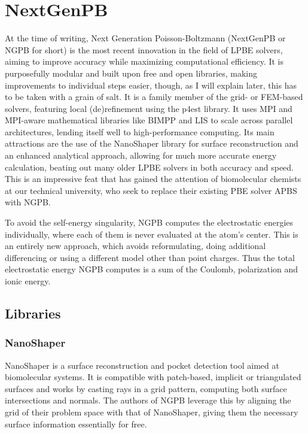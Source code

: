 \chapter{NextGenPB}
\label{sec:nextgenpb}

At the time of writing, Next Generation Poisson-Boltzmann (NextGenPB or NGPB for short) \cite{diflorio2025nextgenpb} is the most recent innovation in the field of LPBE solvers, aiming to improve accuracy while maximizing computational efficiency. 
It is purposefully modular and built upon free and open libraries, making improvements to individual steps easier, though, as I will explain later, this has to be taken with a grain of salt.
It is a family member of the grid- or FEM-based solvers, featuring local (de)refinement using the p4est library.
It uses MPI and MPI-aware mathematical libraries like BIMPP and LIS to scale across parallel architectures, lending itself well to high-performance computing.
Its main attractions are the use of the NanoShaper library for surface reconstruction and an enhanced analytical approach, allowing for much more accurate energy calculation, beating out many older LPBE solvers in both accuracy and speed.
This is an impressive feat that has gained the attention of biomolecular chemists at our technical university, who seek to replace their existing PBE solver APBS \cite{jurrus2018apbs} with NGPB.

To avoid the self-energy singularity, NGPB computes the electrostatic energies individually, where each of them is never evaluated at the atom's center.
This is an entirely new approach, which avoids reformulating, doing additional differencing or using a different model other than point charges.
Thus the total electrostatic energy NGPB computes is a sum of the Coulomb, polarization and ionic energy.

\section{Libraries}
\label{sec:nextgenpb-libraries}

\subsection{NanoShaper}
\label{sec:nextgenpb-libraries-nanoshaper}

NanoShaper \cite{abate2025nanoshaperweb} is a surface reconstruction and pocket detection tool aimed at biomolecular systems.
It is compatible with patch-based, implicit or triangulated surfaces and works by casting rays in a grid pattern, computing both surface intersections and normals. 
The authors of NGPB leverage this by aligning the grid of their problem space with that of NanoShaper, giving them the necessary surface information essentially for free.

